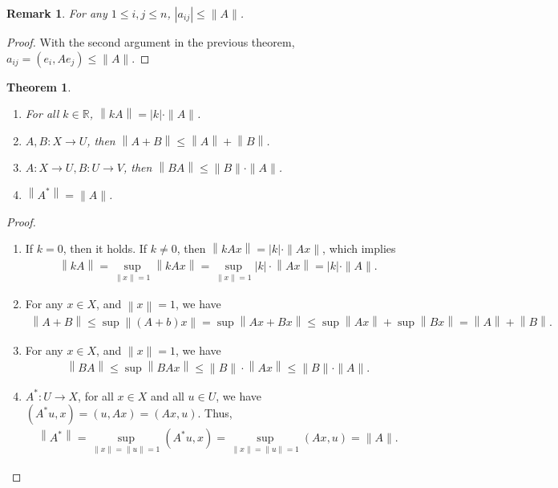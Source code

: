 \documentclass[11pt]{book}
\newtheorem{theorem}{Theorem}[chapter]
\newtheorem{remark}{Remark}[chapter]
\theoremstyle{definition}
\numberwithin{equation}{chapter}
\begin{document}
\begin{remark}
For any $1\leq i,j\leq n$, $\left|a_{ij}\right| \leq \|A\|$.
\end{remark}
\begin{proof}
With the second argument in the previous theorem, $a_{ij} = (e_i,Ae_j) \leq \|A\|$.
\end{proof}

\medskip

\begin{theorem}
~\begin{enumerate}[label=(\alph*)]
    \item For all $k\in\mathbb{R}$, $\left\|kA\right\| = |k|\cdot \|A\|$.
    \item $A,B:X\to U$, then $\left\|A + B\right\| \leq \left\|A\right\| + \left\|B\right\|$.
    \item $A:X\to U, B:U\to V$, then $\left\|BA\right\| \leq \|B\|\cdot \|A\|$.
    \item $\left\|A^*\right\| = \|A\|$.
\end{enumerate}
\end{theorem}
\begin{proof}
~\begin{enumerate}[label=(\alph*)]
    \item If $k = 0$, then it holds. If $k\neq 0$, then $\left\|kAx\right\| = |k| \cdot \|Ax\|$, which implies
    \begin{align*}
        \left\|kA\right\| = \sup_{\|x\|=1} \left\|kAx\right\| = \sup_{\|x\|=1} |k| \cdot \left\|Ax\right\| = |k|\cdot \|A\|.
    \end{align*}
    \item For any $x\in X$, and $\left\|x\right\| = 1$, we have 
    \begin{align*}
        \left\|A + B\right\| \leq \sup \left\|(A+b)x\right\| = \sup \left\|Ax + Bx\right\| \leq \sup \left\|Ax\right\| + \sup \left\|Bx\right\| = \left\|A\right\| + \left\|B\right\|.
    \end{align*}
    \item For any $x\in X$, and $\|x\| = 1$, we have 
    \begin{align*}
        \left\|BA\right\| \leq \sup \left\|BAx\right\| \leq \|B\|\cdot \left\|Ax\right\| \leq \|B\|\cdot \|A\|.
    \end{align*}
    \item $A^*:U\to X$, for all $x\in X$ and all $u\in U$, we have $(A^* u, x) = (u, Ax) = (Ax, u)$. Thus, 
    \begin{align*}
        \left\|A^*\right\| = \sup_{\|x\| = \|u\| = 1} (A^*u,x) = \sup_{\|x\| = \|u\| = 1} (Ax,u) = \|A\|.
    \end{align*}
\end{enumerate}
\end{proof}
\end{document}
